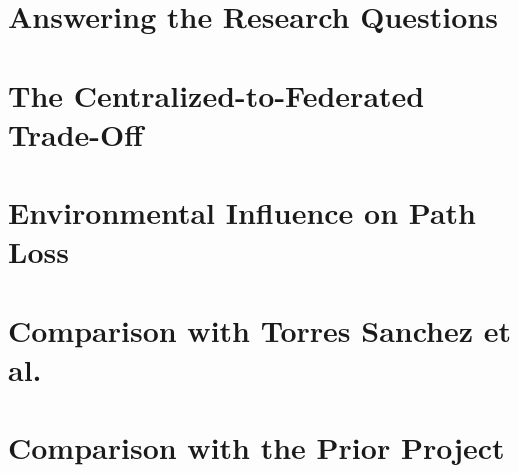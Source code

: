 
\section{Answering the Research Questions}

\section{The Centralized-to-Federated Trade-Off}

\section{Environmental Influence on Path Loss}

\section{Comparison with Torres Sanchez et al.}

\section{Comparison with the Prior Project}

